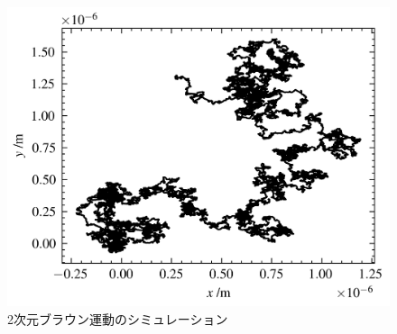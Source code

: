 \begin{figure}
	\centering
	\includegraphics[width=0.8\linewidth]{./src/figures/brownian-2d-sim/brownian-2d-sim.png}
	\caption{2次元ブラウン運動のシミュレーション}\label{fig:brownian-2d-sim}
\end{figure}
